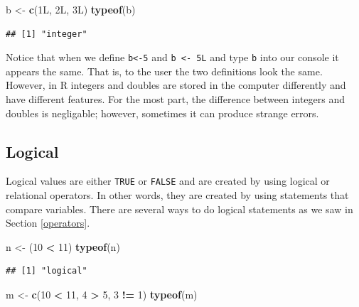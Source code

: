\documentclass[
]{book}
\newenvironment{Shaded}{\begin{snugshade}}{\end{snugshade}}
\newcommand{\DecValTok}[1]{\textcolor[rgb]{0.00,0.00,0.81}{#1}}
\newcommand{\KeywordTok}[1]{\textcolor[rgb]{0.13,0.29,0.53}{\textbf{#1}}}
\newcommand{\NormalTok}[1]{#1}
\newcommand{\OperatorTok}[1]{\textcolor[rgb]{0.81,0.36,0.00}{\textbf{#1}}}
\newcommand{\StringTok}[1]{\textcolor[rgb]{0.31,0.60,0.02}{#1}}
\begin{document}
\begin{Shaded}
\begin{Highlighting}[]
\NormalTok{b <-}\StringTok{ }\KeywordTok{c}\NormalTok{(1L, 2L, 3L)}
\KeywordTok{typeof}\NormalTok{(b)}
\end{Highlighting}
\end{Shaded}

\begin{verbatim}
## [1] "integer"
\end{verbatim}

Notice that when we define \texttt{b\textless{}-5} and \texttt{b\ \textless{}-\ 5L} and type \texttt{b} into our console it appears the same. That is, to the user the two definitions look the same. However, in R integers and doubles are stored in the computer differently and have different features. For the most part, the difference between integers and doubles is negligable; however, sometimes it can produce strange errors.

\hypertarget{logical}{%
\subsection*{Logical}\label{logical}}

Logical values are either \texttt{TRUE} or \texttt{FALSE} and are created by using logical or relational operators. In other words, they are created by using statements that compare variables. There are several ways to do logical statements as we saw in Section \ref{operators}.

\begin{Shaded}
\begin{Highlighting}[]
\NormalTok{n <-}\StringTok{ }\NormalTok{(}\DecValTok{10} \OperatorTok{<}\StringTok{ }\DecValTok{11}\NormalTok{)}
\KeywordTok{typeof}\NormalTok{(n)}
\end{Highlighting}
\end{Shaded}

\begin{verbatim}
## [1] "logical"
\end{verbatim}

\begin{Shaded}
\begin{Highlighting}[]
\NormalTok{m <-}\StringTok{ }\KeywordTok{c}\NormalTok{(}\DecValTok{10} \OperatorTok{<}\StringTok{ }\DecValTok{11}\NormalTok{, }\DecValTok{4} \OperatorTok{>}\StringTok{ }\DecValTok{5}\NormalTok{, }\DecValTok{3} \OperatorTok{!=}\StringTok{ }\DecValTok{1}\NormalTok{)}
\KeywordTok{typeof}\NormalTok{(m)}
\end{Highlighting}
\end{Shaded}
\end{document}
